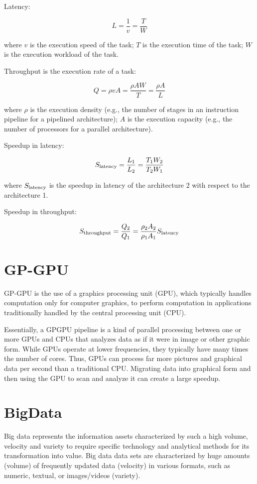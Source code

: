 \documentclass{article}
\begin{document}
Latency: 

$$L=\frac{1}{v}=\frac{T}{W}$$

where $v$ is the execution speed of the task; $T$ is the execution time of the task; $W$ is the execution workload of the task.

Throughput is the execution rate of a task: 

$$Q=\rho v A=\frac{\rho A W}{T}=\frac{\rho A}{L}$$

where $\rho$ is the execution density (e.g., the number of stages in an instruction pipeline for a pipelined architecture); $A$ is the execution capacity (e.g., the number of processors for a parallel architecture).

Speedup in latency: 

$$S_{\textup{latency}}=\frac{L_1}{L_2}=\frac{T_1 W_2}{T_2 W_1}$$

where $S_{\textup{latency}}$ is the speedup in latency of the architecture 2 with respect to the architecture 1.

Speedup in throughput: 

$$S_{\textup{throughput}}=\frac{Q_2}{Q_1}=\frac{\rho_2 A_2}{\rho_1 A_1} S_{\textup{latency}}$$

\section{GP-GPU}

GP-GPU is the use of a graphics processing unit (GPU), which typically handles computation only for computer graphics, to perform computation in applications traditionally handled by the central processing unit (CPU)\cite{fung2002mediated, aimone2003eyetap, fung2004computer, chitty2007data}.

Essentially, a GPGPU pipeline is a kind of parallel processing between one or more GPUs and CPUs that analyzes data as if it were in image or other graphic form. While GPUs operate at lower frequencies, they typically have many times the number of cores. Thus, GPUs can process far more pictures and graphical data per second than a traditional CPU. Migrating data into graphical form and then using the GPU to scan and analyze it can create a large speedup. 

\section{BigData}

Big data represents the information assets characterized by such a high volume, velocity and variety to require specific technology and analytical methods for its transformation into value\cite{de2016formal}. Big data data sets are characterized by huge amounts (volume) of frequently updated data (velocity) in various formats, such as numeric, textual, or images/videos (variety)\cite{kaplan2019siri}.
\end{document}
